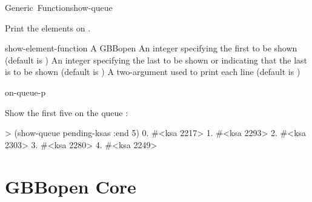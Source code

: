 \documentclass[10pt,twoside,english,pdftex]{article}
\begin{document}
\begin{functiondoc}{Generic~Function}{show-queue}{
     }
%
%
%

\fnsyntax

\fnpurpose Print the elements on .

\fnmethods
{}

\fnpackage {}

\fnmodule {}

\fnargs
\begin{args}{show-element-function}
\arg[queue] A GBBopen 
\arg[start] An integer specifying the first  to
be shown (default is )
\arg[end] An integer specifying the last  to
be shown or \nil{} indicating that the last  is
to be shown (default is \nil) 
 A two-argument  used to print each
 line (default is )
\end{args}

\begin{alsos}{on-queue-p}
\also[on-queue-p]
\end{alsos}

\fnexample
Show the first five  on the queue :
\begin{example}
> (show-queue pending-ksas :end 5)
    0. #<ksa 2217>
    1. #<ksa 2293>
    2. #<ksa 2303>
    3. #<ksa 2280>
    4. #<ksa 2249>
\end{example}

\end{functiondoc}


\W\renewcommand{\subsubentities}{}

\T\markright{}%
\T\pagestyle{plain}
\T\cleardoublepage
\W{}
\T\pagestyle{fancy}
\T\thispagestyle{fancybottom}
\T\global\def\fnlastname{ }%
\T\renewcommand{\headrulewidth}{0pt}
\section{GBBopen Core}
\end{document}
